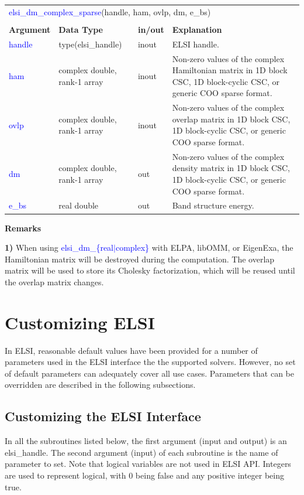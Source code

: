 \documentclass{report}
\newcommand{\tcb}[1]{\textcolor{blue}{#1}}
\begin{document}
\begin{tabular}[]{|p{20mm}|p{45mm}|p{15mm}|p{85mm}|}
\multicolumn{4}{l}{\tcb{elsi\_dm\_complex\_sparse}(handle, ham, ovlp, dm, e\_bs)}\\
\multicolumn{4}{l}{}\\
\hline
\multicolumn{1}{|l|}{\textbf{Argument}} & \multicolumn{1}{l|}{\textbf{Data Type}} & \multicolumn{1}{l|}{\textbf{in/out}} & \multicolumn{1}{l|}{\textbf{Explanation}}\\
\hline
\tcb{handle} & type(elsi\_handle)           & inout & ELSI handle.\\
\hline
\tcb{ham}    & complex double, rank-1 array & inout & Non-zero values of the complex Hamiltonian matrix in 1D block CSC, 1D block-cyclic CSC, or generic COO sparse format.\\
\hline
\tcb{ovlp}   & complex double, rank-1 array & inout & Non-zero values of the complex overlap matrix in 1D block CSC, 1D block-cyclic CSC, or generic COO sparse format.\\
\hline
\tcb{dm}     & complex double, rank-1 array & out   & Non-zero values of the complex density matrix in 1D block CSC, 1D block-cyclic CSC, or generic COO sparse format.\\
\hline
\tcb{e\_bs}  & real double                  & out   & Band structure energy.\\
\hline
\end{tabular}

\textbf{Remarks}

\textbf{1)} When using \tcb{elsi\_dm\_\{real$\vert$complex\}} with ELPA, libOMM, or EigenExa, the Hamiltonian matrix will be destroyed during the computation. The overlap matrix will be used to store its Cholesky factorization, which will be reused until the overlap matrix changes.

\section{Customizing ELSI}
\label{sec:setter}
In ELSI, reasonable default values have been provided for a number of parameters used in the ELSI interface the the supported solvers. However, no set of default parameters can adequately cover all use cases. Parameters that can be overridden are described in the following subsections.

\subsection{Customizing the ELSI Interface}
\label{subsec:setter_elsi}
In all the subroutines listed below, the first argument (input and output) is an elsi\_handle. The second argument (input) of each subroutine is the name of parameter to set. Note that logical variables are not used in ELSI API. Integers are used to represent logical, with 0 being false and any positive integer being true.
\end{document}
